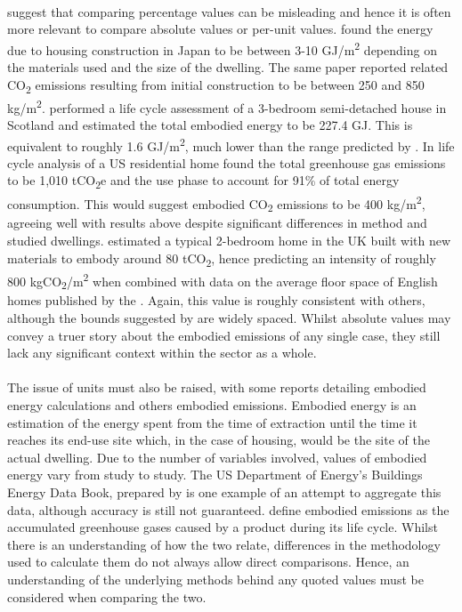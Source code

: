\documentclass[12pt]{article}
\begin{document}
\paragraph{} \citet{Hamilton-MacLaren2009-pt} suggest that comparing percentage values can be misleading and hence it is often more relevant to compare absolute values or per-unit values. \citet{Suzuki1995-ve} found the energy due to housing construction in Japan to be between 3-10 GJ/m\textsuperscript{2} depending on the materials used and the size of the dwelling. The same paper reported related CO\textsubscript{2} emissions resulting from initial construction to be between 250 and 850 kg/m\textsuperscript{2}. \citet{Asif2007-sx} performed a life cycle assessment of a 3-bedroom semi-detached house in Scotland and estimated the total embodied energy to be 227.4 GJ. This is equivalent to roughly 1.6 GJ/m\textsuperscript{2}, much lower than the range predicted by \citet{Suzuki1995-ve}. In life cycle analysis of a US residential home \citet{Keoleian2000-de} found the total greenhouse gas emissions to be 1,010 tCO\textsubscript{2}e and the use phase to account for 91\% of total energy consumption. This would suggest embodied CO\textsubscript{2} emissions to be 400 kg/m\textsuperscript{2}, agreeing well with results above despite significant differences in method and studied dwellings. \citet{The_Committee_on_Climate_Change2008-xn} estimated a typical 2-bedroom home in the UK built with new materials to embody around 80 tCO\textsubscript{2}, hence predicting an intensity of roughly 800 kgCO\textsubscript{2}/m\textsuperscript{2} when combined with data on the average floor space of English homes published by the \citet{Department_for_Communities_and_Local_Government2015-rv}. Again, this value is roughly consistent with others, although the bounds suggested by \citet{Suzuki1995-ve} are widely spaced. Whilst absolute values may convey a truer story about the embodied emissions of any single case, they still lack any significant context within the sector as a whole. 

\paragraph{}
The issue of units must also be raised, with some reports detailing embodied energy calculations and others embodied emissions. Embodied energy is an estimation of the energy spent from the time of extraction until the time it reaches its end-use site which, in the case of housing, would be the site of the actual dwelling. Due to the number of variables involved, values of embodied energy vary from study to study. The US Department of Energy’s Buildings Energy Data Book, prepared by \citet{DR_International_Ltd2012-td} is one example of an attempt to aggregate this data, although accuracy is still not guaranteed. \citet{Lushnikova2016-kl} define embodied emissions as the accumulated greenhouse gases caused by a product during its life cycle. Whilst there is an understanding of how the two relate, differences in the methodology used to calculate them do not always allow direct comparisons. Hence, an understanding of the underlying methods behind any quoted values must be considered when comparing the two.
\end{document}
